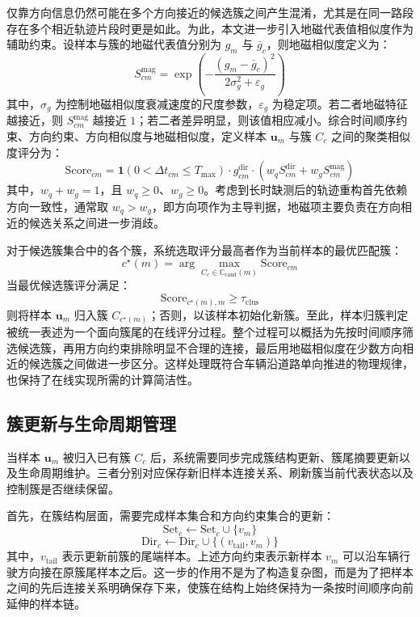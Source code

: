 \documentclass{xdupgthesis}
\begin{document}
仅靠方向信息仍然可能在多个方向接近的候选簇之间产生混淆，尤其是在同一路段存在多个相近轨迹片段时更是如此。为此，本文进一步引入地磁代表值相似度作为辅助约束。设样本与簇的地磁代表值分别为 $g_m$ 与 $\bar{g}_c$，则地磁相似度定义为：
\begin{equation}
	S_{cm}^{\mathrm{mag}}=
	\exp
	\left(
	-\frac{(g_m-\bar{g}_c)^2}{2\sigma_g^2+\varepsilon_g}
	\right)
\end{equation}
其中，$\sigma_g$ 为控制地磁相似度衰减速度的尺度参数，$\varepsilon_g$ 为稳定项。若二者地磁特征越接近，则 $S_{cm}^{\mathrm{mag}}$ 越接近 $1$；若二者差异明显，则该值相应减小。综合时间顺序约束、方向约束、方向相似度与地磁相似度，定义样本 $\mathbf{u}_m$ 与簇 $C_c$ 之间的聚类相似度评分为：
\begin{equation}
	\mathrm{Score}_{cm}=
	\mathbf{1}
	\left(
	0<\Delta t_{cm}\le T_{\max}
	\right)
	\cdot
	g_{cm}^{\mathrm{dir}}
	\cdot
	\left(
	w_q S_{cm}^{\mathrm{dir}}+w_g S_{cm}^{\mathrm{mag}}
	\right)
\end{equation}
其中，$w_q+w_g=1$，且 $w_q\ge 0$、$w_g\ge 0$。考虑到长时缺测后的轨迹重构首先依赖方向一致性，通常取 $w_q>w_g$，即方向项作为主导判据，地磁项主要负责在方向相近的候选关系之间进一步消歧。

对于候选簇集合中的各个簇，系统选取评分最高者作为当前样本的最优匹配簇：
\begin{equation}
	c^{\star}(m)=
	\arg\max_{C_c\in\mathbb{C}_{\mathrm{cand}}(m)}\mathrm{Score}_{cm}
\end{equation}
当最优候选簇评分满足：
\begin{equation}
	\mathrm{Score}_{c^{\star}(m),m}\ge \tau_{\mathrm{clus}}
\end{equation}
则将样本 $\mathbf{u}_m$ 归入簇 $C_{c^{\star}(m)}$；否则，以该样本初始化新簇。至此，样本归簇判定被统一表述为一个面向簇尾的在线评分过程。整个过程可以概括为先按时间顺序筛选候选簇，再用方向约束排除明显不合理的连接，最后用地磁相似度在少数方向相近的候选簇之间做进一步区分。这样处理既符合车辆沿道路单向推进的物理规律，也保持了在线实现所需的计算简洁性。


\subsection{簇更新与生命周期管理}

当样本 $\mathbf{u}_m$ 被归入已有簇 $C_c$ 后，系统需要同步完成簇结构更新、簇尾摘要更新以及生命周期维护。三者分别对应保存新旧样本连接关系、刷新簇当前代表状态以及控制簇是否继续保留。

首先，在簇结构层面，需要完成样本集合和方向约束集合的更新：
\begin{equation}
	\mathrm{Set}_c\leftarrow \mathrm{Set}_c\cup\{v_m\}
\end{equation}
\begin{equation}
	\mathrm{Dir}_c\leftarrow \mathrm{Dir}_c\cup\{(v_{\mathrm{tail}},v_m)\}
\end{equation}
其中，$v_{\mathrm{tail}}$ 表示更新前簇的尾端样本。上述方向约束表示新样本 $v_m$ 可以沿车辆行驶方向接在原簇尾样本之后。这一步的作用不是为了构造复杂图，而是为了把样本之间的先后连接关系明确保存下来，使簇在结构上始终保持为一条按时间顺序向前延伸的样本链。
\end{document}
